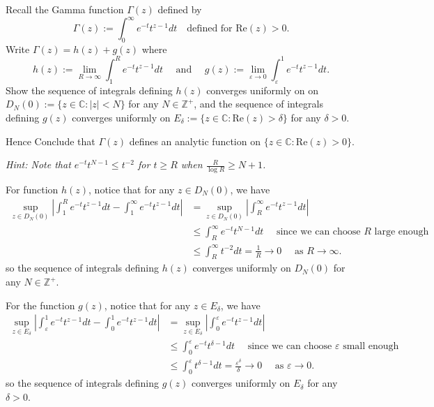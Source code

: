 \documentclass{elegantbook}
\begin{document}
\begin{problemset}[Exercises]
  \item Recall the Gamma function $\Gamma(z)$ defined by
  \[
    \Gamma(z) := \int^\infty_0 e^{-t} t^{z-1} dt \quad \text{defined for } \mathrm{Re}(z) > 0.
  \]
  Write $\Gamma(z)=h(z) + g(z)$ where 
  \[
    h(z) := \lim_{R\to\infty}\int_{1}^{R} e^{-t} t^{z-1} dt \quad \text{ and } \quad g(z) := \lim_{\varepsilon \to 0} \int_{\varepsilon}^{1} e^{-t} t^{z-1} dt.
  \]
  Show the sequence of integrals defining $h(z)$ converges uniformly on on $D_{N}(0) := \{z\in\mathbb{C} : |z| < N\}$ for any $N\in\mathbb{Z}^+$, and the sequence of integrals defining $g(z)$ converges uniformly on $E_{\delta} := \{z\in\mathbb{C} : \mathrm{Re}(z) > \delta\}$ for any $\delta > 0$.

  Hence Conclude that $\Gamma(z)$ defines an analytic function on $\{z\in\mathbb{C} : \mathrm{Re}(z) > 0\}$.

  \textit{Hint: Note that $e^{-t}t^{N-1}\leq t^{-2}$ for $t\geq R$ when $\frac{R}{\log R}\geq N+1$.}

  \begin{solution}
    For function $h(z)$, notice that for any $z\in D_{N}(0)$, we have
    \[
    \begin{aligned}
      \sup_{z\in D_{N}(0)} \left| \int_{1}^{R} e^{-t} t^{z-1} dt - \int_{1}^{\infty} e^{-t} t^{z-1} dt \right| &= \sup_{z\in D_{N}(0)} \left| \int_{R}^{\infty} e^{-t} t^{z-1} dt \right| \\
      &\leq \int_{R}^{\infty} e^{-t} t^{N-1} dt \quad \text{ since we can choose $R$ large enough} \\
      &\leq \int_{R}^{\infty} t^{-2} dt = \frac{1}{R} \to 0 \quad \text{ as } R \to \infty.
    \end{aligned}
    \]
    so the sequence of integrals defining $h(z)$ converges uniformly on $D_{N}(0)$ for any $N\in\mathbb{Z}^+$.

    For the function $g(z)$, notice that for any $z\in E_{\delta}$, we have
    \[
    \begin{aligned}
      \sup_{z\in E_{\delta}} \left| \int_{\varepsilon}^{1} e^{-t} t^{z-1} dt - \int_{0}^{1} e^{-t} t^{z-1} dt \right| &= \sup_{z\in E_{\delta}} \left| \int_{0}^{\varepsilon} e^{-t} t^{z-1} dt \right| \\
      & \leq \int_{0}^{\varepsilon} e^{-t} t^{\delta-1} dt \quad \text{ since we can choose $\varepsilon$ small enough} \\
      & \leq \int_{0}^{\varepsilon} t^{\delta-1} dt = \frac{\varepsilon^{\delta}}{\delta} \to 0 \quad \text{ as } \varepsilon \to 0.
    \end{aligned}
    \]
    so the sequence of integrals defining $g(z)$ converges uniformly on $E_{\delta}$ for any $\delta > 0$.


\end{solution}
\end{problemset}
\end{document}
